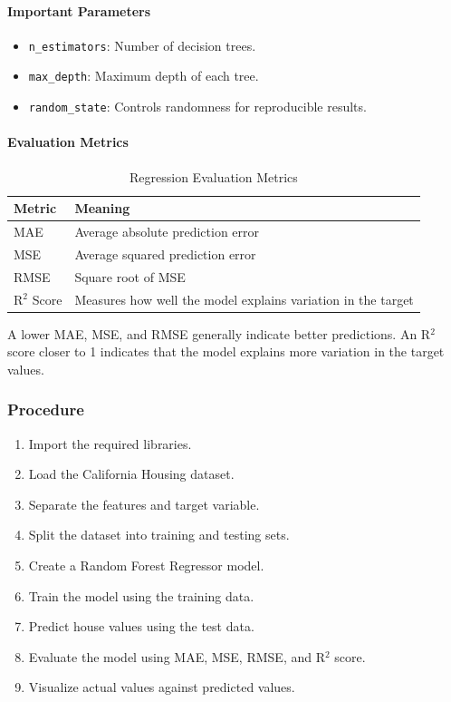 \documentclass[a4paper,11pt]{article}
\begin{document}
\paragraph{Important Parameters}
\begin{itemize}
    \item \texttt{n\_estimators}: Number of decision trees.
    \item \texttt{max\_depth}: Maximum depth of each tree.
    \item \texttt{random\_state}: Controls randomness for reproducible results.
\end{itemize}

\paragraph{Evaluation Metrics}
\begin{table}[H]
\centering
\caption{Regression Evaluation Metrics}
\begin{tabular}{ll}
\toprule
\textbf{Metric} & \textbf{Meaning} \\
\midrule
MAE      & Average absolute prediction error \\
MSE      & Average squared prediction error \\
RMSE     & Square root of MSE \\
R$^2$ Score & Measures how well the model explains variation in the target \\
\bottomrule
\end{tabular}
\end{table}

A lower MAE, MSE, and RMSE generally indicate better predictions. An R$^2$ score closer to 1 indicates that the model explains more variation in the target values.

\subsubsection{Procedure}
\begin{enumerate}
    \item Import the required libraries.
    \item Load the California Housing dataset.
    \item Separate the features and target variable.
    \item Split the dataset into training and testing sets.
    \item Create a Random Forest Regressor model.
    \item Train the model using the training data.
    \item Predict house values using the test data.
    \item Evaluate the model using MAE, MSE, RMSE, and R$^2$ score.
    \item Visualize actual values against predicted values.
\end{enumerate}
\end{document}
